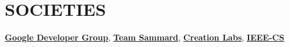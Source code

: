 \documentclass[letterpaper,11pt]{article}
\begin{document}
\section{SOCIETIES}
 \begin{itemize}[leftmargin=0.15in, label={}]
    \small{\item{
     \href{https://gdg.community.dev/gdg-on-campus-vellore-institute-of-technology-chennai-india/}{\textbf{Google Developer Group}}, \href{https://www.teamsammard.com/}{\textbf{Team Sammard}}, \href{https://in.linkedin.com/company/creationlabs}{\textbf{Creation Labs}}, \href{https://ieeecsvit.com/}{\textbf{IEEE-CS}} {}\\
    }}
 \end{itemize}
 \vspace{-16pt}

 
\end{document}
